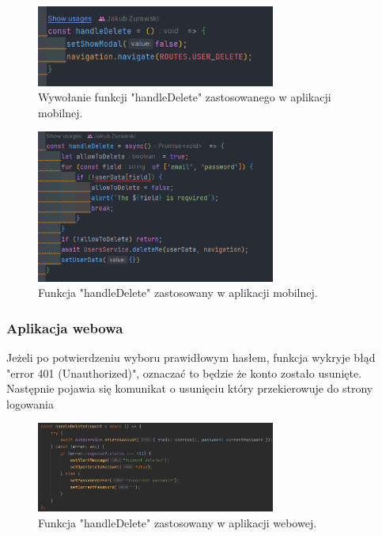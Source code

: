 \begin{figure}[H]
    \centering
    \includegraphics[width=0.7\textwidth]{chapters/chapter_8/screens/delete_user_mobile_1}
    \caption{Wywołanie funkcji "handleDelete" zastosowanego w aplikacji mobilnej.}
    \label{img:delete_user_mobile_1}
\end{figure}

\begin{figure}[H]
    \centering
    \includegraphics[width=0.7\textwidth]{chapters/chapter_8/screens/delete_user_mobile_2}
    \caption{Funkcja "handleDelete" zastosowany w aplikacji mobilnej.}
    \label{img:delete_user_mobile_2}
\end{figure}

\subsubsection{Aplikacja webowa}

Jeżeli po potwierdzeniu wyboru prawidłowym hasłem, funkcja wykryje błąd "error 401 (Unauthorized)", oznaczać to będzie że konto zostało usunięte. Następnie pojawia się komunikat o usunięciu który przekierowuje do strony logowania

\begin{figure}[H]
    \centering
    \includegraphics[width=0.7\textwidth]{chapters/chapter_8/screens/delete_user_web}
    \caption{Funkcja "handleDelete" zastosowany w aplikacji webowej.}
    \label{img:delete_user_web}
\end{figure}

